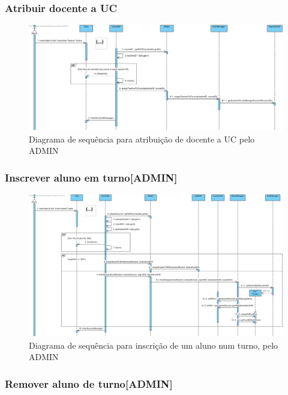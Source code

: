\documentclass[a4paper]{article}
\begin{document}
\subsubsection{Atribuir docente a UC}

\begin{figure}[H]
\centering
\includegraphics[width=14cm]{SEQAssociarDocenteAUC}
\caption{Diagrama de sequência para atribuição de docente a UC pelo ADMIN}
\label{}
\end{figure}

\subsubsection{Inscrever aluno em turno[ADMIN]}

\begin{figure}[H]
\centering
\includegraphics[width=14cm]{SEQInscreverAlunoTurno(peloAdmin)}
\caption{Diagrama de sequência para inscrição de um aluno num turno, pelo ADMIN}
\label{}
\end{figure}

\subsubsection{Remover aluno de turno[ADMIN]}
\end{document}
